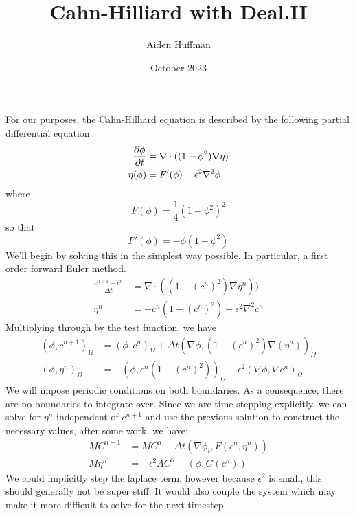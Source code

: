\documentclass{article}
\title{Cahn-Hilliard with Deal.II}
\author{Aiden Huffman}
\date{October 2023}
\begin{document}
\maketitle

For our purposes, the Cahn-Hilliard equation is described by the following
partial differential equation
\begin{align}
    \diffp{\phi}{t} &= \nabla\cdot((1-\phi^2)\nabla\eta)\\
    \eta(\phi) &= F'(\phi)-\epsilon^2 \nabla^2 \phi\\
\end{align}
where
\begin{equation}
    F(\phi) = \frac{1}{4}(1-\phi^2)^2
\end{equation}
so that
\begin{equation}
    F'(\phi) = -\phi(1-\phi^2)
\end{equation}
We'll begin by solving this in the simplest way possible. In particular, a first
order forward Euler method.
\begin{align}
\frac{c^{n+1}-c^{n}}{\Delta t} &= \nabla\cdot((1-(c^n)^2)\nabla\eta^n))\\
\eta^n &= -c^n(1-(c^n)^2) - \epsilon^2 \nabla^2 c^n
\end{align}
Multiplying through by the test function, we have
\begin{align}
    (\phi, c^{n+1})_\Omega &= (\phi, c^n)_\Omega
                            + \Delta t (\nabla \phi, (1-(c^n)^2)\nabla(\eta^n))_\Omega\\
    (\phi, \eta^n)_\Omega &= -(\phi, c^n(1-(c^n)^2))_\Omega 
                            - \epsilon^2 (\nabla\phi, \nabla c^n)_\Omega
\end{align}
We will impose periodic conditions on both boundaries. As a consequence, there
are no boundaries to integrate over. Since we are time stepping explicitly, we
can solve for $\eta^n$ independent of $c^{n+1}$ and use the previous solution
to construct the necessary values, after some work, we have:
\begin{align}
    MC^{n+1} &= MC^n + \Delta t (\nabla \phi_i, F(c^n, \eta^n))\\
    M\eta^n &= -\epsilon^2 A C^n - (\phi, G(c^n))
\end{align}
We could implicitly step the laplace term, however because $\epsilon^2$ is
small, this should generally not be super stiff. It would also couple the system
which may make it more difficult to solve for the next timestep.
\end{document}
